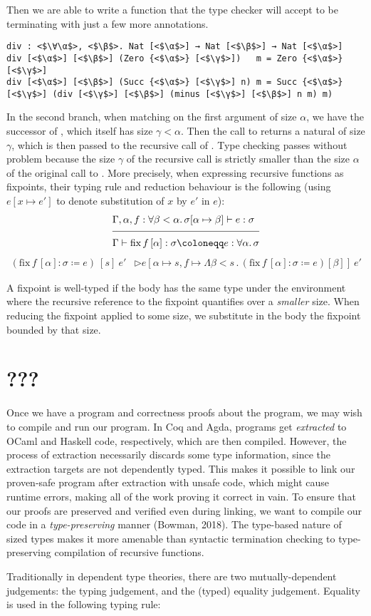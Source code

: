 \documentclass[acmsmall,nonacm]{acmart}
\newcommand{\α}{\alpha}
\newcommand{\β}{\beta}
\newcommand{\γ}{\gamma}
\newcommand{\σ}{\sigma}
\newcommand{\Γ}{\Gamma}
\newcommand{\Λ}{\Lambda}
\newcommand{\∀}{\forall}
\newcommand{\↑}{\uparrow}
\newcommand{\⊢}{\vdash}
\newcommand{\↦}{\mapsto}
\newcommand{\⊳}{\rhd}
\newcommand{\fix}{\textrm{fix}}
\begin{document}
Then we are able to write a  function that the type checker will accept to be terminating
with just a few more annotations.

\begin{verbatim}
div : <$\∀\α$>, <$\β$>. Nat [<$\α$>] → Nat [<$\β$>] → Nat [<$\α$>]
div [<$\α$>] [<$\β$>] (Zero {<$\α$>} [<$\γ$>])   m = Zero {<$\α$>} [<$\γ$>]
div [<$\α$>] [<$\β$>] (Succ {<$\α$>} [<$\γ$>] n) m = Succ {<$\α$>} [<$\γ$>] (div [<$\γ$>] [<$\β$>] (minus [<$\γ$>] [<$\β$>] n m) m)
\end{verbatim}

In the second branch, when matching on the first argument of size $\α$, we have the successor of ,
which itself has size $\γ < \α$.
Then the call to  returns a natural of size $\γ$, which is then passed to the recursive call of .
Type checking passes without problem because the size $\γ$ of the recursive call is strictly smaller
than the size $\α$ of the original call to .
More precisely, when expressing recursive functions as fixpoints,
their typing rule and reduction behaviour is the following
(using $e[x \↦ e']$ to denote substitution of $x$ by $e'$ in $e$):
\begin{align*}
&\Γ, \α, f : \∀\β < \α \mathpunct{.} \σ[\α \↦ \β] \⊢ e : \σ \\[-2\jot]
&\cline{1-2}
&\Γ \⊢ \fix \, f \, [\α] : \σ \coloneqq e : \∀\α \mathpunct{.} \σ
\end{align*}
\begin{align*}
(\fix \, f \, [\α] : \σ \coloneqq e) \: [s] \: e' &\⊳ e[\α \↦ s, f \↦ \Λ\β < s \mathpunct{.} (\fix \, f \, [\α] : \σ \coloneqq e) [\β]] \: e'
\end{align*}

A fixpoint is well-typed if the body has the same type under the environment where
the recursive reference to the fixpoint quantifies over a \emph{smaller} size.
When reducing the fixpoint applied to some size, we substitute in the body the fixpoint bounded by that size.

\section{???}

Once we have a program and correctness proofs about the program, we may wish to compile and run our program.
In Coq and Agda, programs get \emph{extracted} to OCaml and Haskell code, respectively, which are then compiled.
However, the process of extraction necessarily discards some type information,
since the extraction targets are not dependently typed.
This makes it possible to link our proven-safe program after extraction with unsafe code,
which might cause runtime errors, making all of the work proving it correct in vain.
To ensure that our proofs are preserved and verified even during linking,
we want to compile our code in a \emph{type-preserving} manner (Bowman, 2018).
The type-based nature of sized types makes it more amenable than syntactic termination checking
to type-preserving compilation of recursive functions.

Traditionally in dependent type theories, there are two mutually-dependent judgements:
the typing judgement, and the (typed) equality judgement.
Equality is used in the following typing rule:
\end{document}
